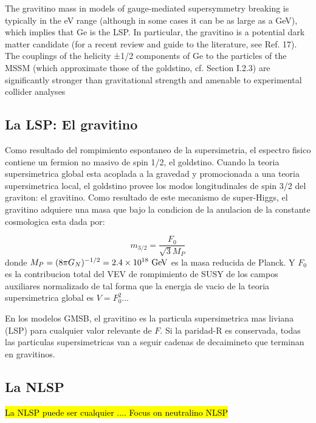 The gravitino mass in models of gauge-mediated supersymmetry
breaking is typically in the eV range (although in some
cases it can be as large as a GeV), which implies that Ge is
the LSP. In particular, the gravitino is a potential dark matter
candidate (for a recent review and guide to the literature, see
Ref. 17). The couplings of the helicity ±1/2 components of Ge
to the particles of the MSSM (which approximate those of
the goldstino, cf. Section I.2.3) are significantly stronger than
gravitational strength and amenable to experimental collider
analyses



\subsection{La LSP: El gravitino}

Como resultado del rompimiento espontaneo de la supersimetria, el espectro fisico
contiene un fermion no masivo de spin 1/2, el goldstino. Cuando la teoria supersimetrica
global esta acoplada a la gravedad y promocionada a una teoria supersimetrica local,
el goldstino provee los modos longitudinales de spin 3/2 del graviton: el gravitino.
Como resultado de este mecanismo de super-Higgs, el gravitino adquiere una masa
que bajo la condicion de la anulacion de la constante cosmologica esta dada por:

\begin{equation}
  m_{3/2} = \frac{F_0}{\sqrt{3}M_P}
\end{equation}
%
donde $M_P = (8\pi G_N)^{-1/2} = 2.4 \times 10^{18} \gev$ es la masa reducida de Planck.
Y $F_0$ es la contribucion total del VEV de rompimiento de SUSY de los campos auxiliares
normalizado de tal forma que la energia de vacio de la teoria supersimetrica global es
$V = F_0^2$...

En los modelos GMSB, el gravitino es la particula supersimetrica mas liviana (LSP) para
cualquier valor relevante de $F$. Si la paridad-R es conservada, todas las particulas
supersimetricas van a seguir cadenas de decaimineto que terminan en gravitinos.


\subsection{La NLSP}

\hl{La NLSP puede ser cualquier .... Focus on neutralino NLSP}


